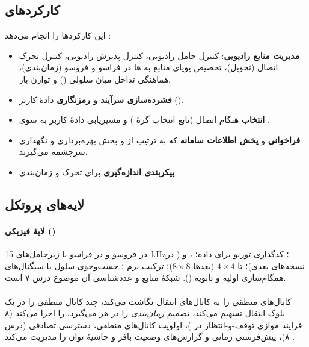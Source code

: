 \documentclass[11pt,a4paper]{article}
\begin{document}
\subsection{کارکردهای }
 این کارکردها را انجام می‌دهد \cite{ts36300}:
\begin{itemize}
  \item \textbf{مدیریت منابع رادیویی}: کنترل حامل رادیویی، کنترل پذیرش رادیویی، کنترل تحرک اتصال
        (تحویل)، تخصیص پویای منابع به ها در فراسو و فروسو (زمان‌بندی)، هماهنگی تداخل میان سلولی
        () و توازن بار.
  \item \textbf{فشرده‌سازی سرآیند و رمزنگاری} دادهٔ کاربر ().
  \item \textbf{انتخاب } هنگام اتصال (تابع انتخاب گرهٔ ) و مسیریابی دادهٔ کاربر به سوی .
  \item \textbf{فراخوانی} و \textbf{پخش اطلاعات سامانه} که به ترتیب از  و بخش بهره‌برداری و
        نگهداری سرچشمه می‌گیرند.
  \item \textbf{پیکربندی اندازه‌گیری} برای تحرک و زمان‌بندی.
\end{itemize}

\subsection{لایه‌های پروتکل}
\paragraph{لایهٔ فیزیکی ()}  در فروسو و  در فراسو با زیرحامل‌های
\qty{15}{\kilo\hertz}؛ کدگذاری توربو برای داده؛ ،  و  ( در نسخه‌های
بعدی)؛ تا  $4\times4$ (بعدها $8\times8$)؛ ترکیب نرم ؛ جست‌وجوی سلول با سیگنال‌های
همگام‌سازی اولیه و ثانویه (). شبکهٔ منابع و عدد‌شناسی آن موضوع درس ۷ است.

\paragraph{} کانال‌های منطقی را به کانال‌های انتقال نگاشت می‌کند، چند کانال منطقی را در یک بلوک
انتقال تسهیم می‌کند، تصمیم \emph{زمان‌بندی} را در هر  می‌گیرد،  را اجرا می‌کند (۸ فرایند
موازی توقف-و-انتظار در )، اولویت کانال‌های منطقی، دسترسی تصادفی (درس ۸)، پیش‌فرستی زمانی و
گزارش‌های وضعیت بافر و حاشیهٔ توان را مدیریت می‌کند \cite{ts36321}.
\end{document}
